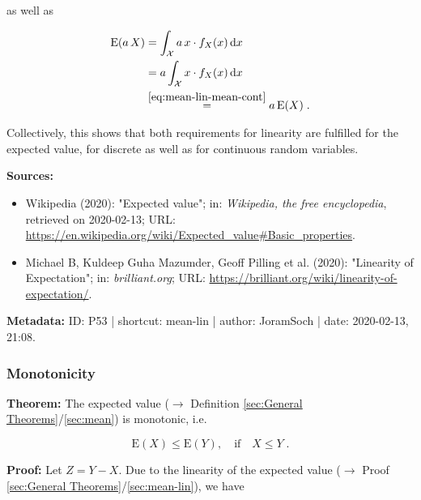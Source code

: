 \documentclass[a4paper,12pt,twoside]{book}
\begin{document}
as well as

\begin{equation} \label{eq:mean-lin-mean-lin-s2-cont}
\begin{split}
\mathrm{E}(a\,X) &= \int_{\mathcal{X}} a \, x \cdot f_X(x) \, \mathrm{d}x \\
&= a \int_{\mathcal{X}} x \cdot f_X(x) \, \mathrm{d}x \\
&\overset{\eqref{eq:mean-lin-mean-cont}}{=} a \, \mathrm{E}(X) \; .
\end{split}
\end{equation}

\vspace{1em}
Collectively, this shows that both requirements for linearity are fulfilled for the expected value, for discrete as well as for continuous random variables.


\vspace{1em}
\textbf{Sources:}
\begin{itemize}
\item Wikipedia (2020): "Expected value"; in: \textit{Wikipedia, the free encyclopedia}, retrieved on 2020-02-13; URL: \url{https://en.wikipedia.org/wiki/Expected_value#Basic_properties}.
\item Michael B, Kuldeep Guha Mazumder, Geoff Pilling et al. (2020): "Linearity of Expectation"; in: \textit{brilliant.org}; URL: \url{https://brilliant.org/wiki/linearity-of-expectation/}.
\end{itemize}


\vspace{1em}
\textbf{Metadata:} ID: P53 | shortcut: mean-lin | author: JoramSoch | date: 2020-02-13, 21:08.
\vspace{1em}



\subsubsection[\textbf{Monotonicity}]{Monotonicity} \label{sec:mean-mono}
\setcounter{equation}{0}

\textbf{Theorem:} The expected value ($\rightarrow$ Definition \ref{sec:General Theorems}/\ref{sec:mean}) is monotonic, i.e.

\begin{equation} \label{eq:mean-mono-mean-mono}
\mathrm{E}(X) \leq \mathrm{E}(Y), \quad \text{if} \quad X \leq Y \; .
\end{equation}


\vspace{1em}
\textbf{Proof:} Let $Z = Y - X$. Due to the linearity of the expected value ($\rightarrow$ Proof \ref{sec:General Theorems}/\ref{sec:mean-lin}), we have
\end{document}
